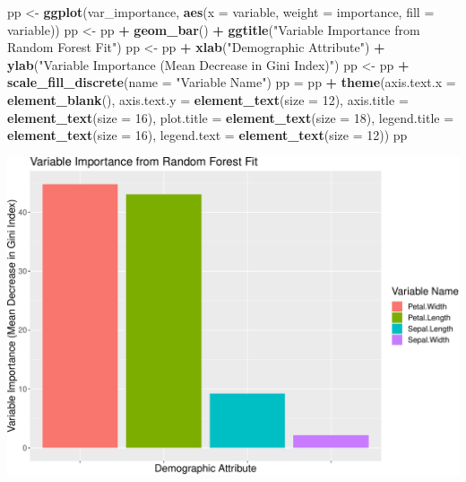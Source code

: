 \documentclass[ignorenonframetext,]{beamer}
\newenvironment{Shaded}{\begin{snugshade}}{\end{snugshade}}
\newcommand{\KeywordTok}[1]{\textcolor[rgb]{0.13,0.29,0.53}{\textbf{#1}}}
\newcommand{\DataTypeTok}[1]{\textcolor[rgb]{0.13,0.29,0.53}{#1}}
\newcommand{\DecValTok}[1]{\textcolor[rgb]{0.00,0.00,0.81}{#1}}
\newcommand{\StringTok}[1]{\textcolor[rgb]{0.31,0.60,0.02}{#1}}
\newcommand{\OperatorTok}[1]{\textcolor[rgb]{0.81,0.36,0.00}{\textbf{#1}}}
\newcommand{\NormalTok}[1]{#1}
\begin{document}
\begin{frame}[fragile]
\begin{Shaded}
\begin{Highlighting}[]
\NormalTok{pp <-}\StringTok{ }\KeywordTok{ggplot}\NormalTok{(var_importance, }\KeywordTok{aes}\NormalTok{(}\DataTypeTok{x =}\NormalTok{ variable, }\DataTypeTok{weight =}\NormalTok{ importance, }\DataTypeTok{fill =}\NormalTok{ variable))}
\NormalTok{pp <-}\StringTok{ }\NormalTok{pp }\OperatorTok{+}\StringTok{ }\KeywordTok{geom_bar}\NormalTok{() }\OperatorTok{+}\StringTok{ }\KeywordTok{ggtitle}\NormalTok{(}\StringTok{"Variable Importance from Random Forest Fit"}\NormalTok{)}
\NormalTok{pp <-}\StringTok{ }\NormalTok{pp }\OperatorTok{+}\StringTok{ }\KeywordTok{xlab}\NormalTok{(}\StringTok{"Demographic Attribute"}\NormalTok{) }\OperatorTok{+}\StringTok{ }\KeywordTok{ylab}\NormalTok{(}\StringTok{"Variable Importance (Mean Decrease in Gini Index)"}\NormalTok{)}
\NormalTok{pp <-}\StringTok{ }\NormalTok{pp }\OperatorTok{+}\StringTok{ }\KeywordTok{scale_fill_discrete}\NormalTok{(}\DataTypeTok{name =} \StringTok{"Variable Name"}\NormalTok{)}
\NormalTok{pp =}\StringTok{ }\NormalTok{pp }\OperatorTok{+}\StringTok{ }\KeywordTok{theme}\NormalTok{(}\DataTypeTok{axis.text.x =} \KeywordTok{element_blank}\NormalTok{(), }\DataTypeTok{axis.text.y =} \KeywordTok{element_text}\NormalTok{(}\DataTypeTok{size =} \DecValTok{12}\NormalTok{), }
    \DataTypeTok{axis.title =} \KeywordTok{element_text}\NormalTok{(}\DataTypeTok{size =} \DecValTok{16}\NormalTok{), }\DataTypeTok{plot.title =} \KeywordTok{element_text}\NormalTok{(}\DataTypeTok{size =} \DecValTok{18}\NormalTok{), }
    \DataTypeTok{legend.title =} \KeywordTok{element_text}\NormalTok{(}\DataTypeTok{size =} \DecValTok{16}\NormalTok{), }\DataTypeTok{legend.text =} \KeywordTok{element_text}\NormalTok{(}\DataTypeTok{size =} \DecValTok{12}\NormalTok{))}
\NormalTok{pp}
\end{Highlighting}
\end{Shaded}

\includegraphics{8TreesBEAMER_files/figure-beamer/unnamed-chunk-37-1.pdf}

\end{frame}
\end{document}
